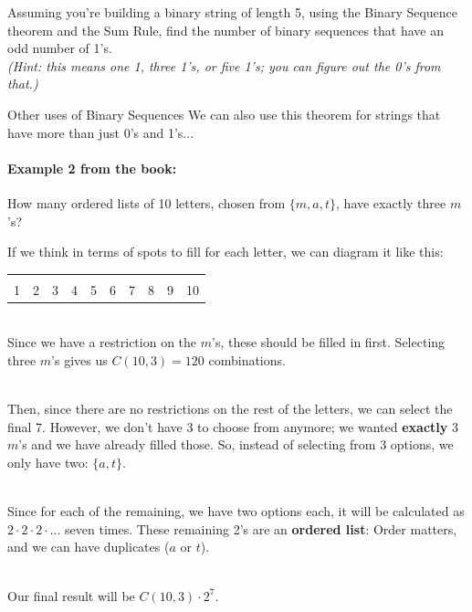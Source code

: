     \hrulefill
       
    \begin{questionNOGRADE}{\thequestion}
	    Assuming you're building a binary string of length 5,
	    using the Binary Sequence theorem and the Sum Rule, 
	    find the number of binary sequences that have an odd number of 1's.
	    \\ \textit{(Hint: this means one 1, three 1's, or five 1's; you can figure out the 0's from that.)}
	\end{questionNOGRADE}
	
	\newpage
	
	\begin{intro}{Other uses of Binary Sequences}
		We can also use this theorem for strings that have more than just 0's and 1's...
		
		\paragraph{Example 2 from the book:} How many ordered lists of 10 letters, chosen from $\{m, a, t\}$, 
		have exactly three $m$'s?
		
		If we think in terms of spots to fill for each letter, we can diagram it like this:
		
		\begin{center}
			\begin{tabular}{c c c c c c c c c c}
				\fitb[0.5cm] & \fitb[0.5cm] & \fitb[0.5cm] & \fitb[0.5cm] & \fitb[0.5cm] & \fitb[0.5cm] & \fitb[0.5cm] & \fitb[0.5cm] & \fitb[0.5cm] & \fitb[0.5cm]
				\\
				1 & 2 & 3 & 4 & 5 & 6 & 7 & 8 & 9 & 10
			\end{tabular}
		\end{center}
		
		~\\ Since we have a restriction on the $m$'s, these should be filled in first. Selecting three $m$'s gives us
		$C(10,3) = 120$ combinations.
		
		~\\ Then, since there are no restrictions on the rest of the letters, we can select the final 7.
		However, we don't have 3 to choose from anymore; we wanted \textbf{exactly} 3 $m$'s and we have
		already filled those. So, instead of selecting from 3 options, we only have two: $\{a, t\}$.
		
		~\\ Since for each of the remaining, we have two options each, it will be calculated as $2 \cdot 2 \cdot 2 \cdot ...$
		seven times. These remaining 2's are an \textbf{ordered list}: Order matters, and we can have duplicates ($a$ or $t$).
		
		~\\ Our final result will be $C(10,3) \cdot 2^{7}$.
	\end{intro}
	
